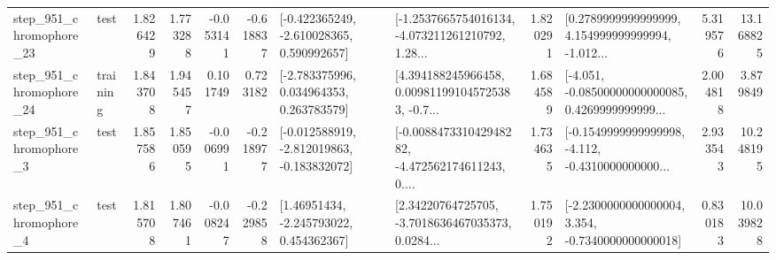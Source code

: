 \begin{tabular}{llrrrrllrlrr}
  step\_951\_chromophore\_23 &      test &      1.826429 &    1.773288 &     -0.053141 & -0.618837 &   [-0.422365249, -2.610028365, 0.590992657] &  [-1.2537665754016134, -4.073211261210792, 1.28... &       1.820291 &  [0.2789999999999999, 4.154999999999994, -1.012... &            5.319576 &         13.168825 \\
  step\_951\_chromophore\_24 &  training &      1.843708 &    1.945457 &      0.101749 &  0.723182 &    [-2.783375996, 0.034964353, 0.263783579] &  [4.394188245966458, 0.009811991045725383, -0.7... &       1.684589 &  [-4.051, -0.08500000000000085, 0.4269999999999... &            2.004818 &          3.879849 \\
   step\_951\_chromophore\_3 &      test &      1.857586 &    1.850595 &     -0.006991 & -0.218977 &  [-0.012588919, -2.812019863, -0.183832072] &  [-0.008847331042948282, -4.472562174611243, 0.... &       1.734635 &  [-0.1549999999999998, -4.112, -0.4310000000000... &            2.933543 &         10.248195 \\
   step\_951\_chromophore\_4 &      test &      1.815708 &    1.807461 &     -0.008247 & -0.229858 &     [1.46951434, -2.245793022, 0.454362367] &  [2.34220764725705, -3.7018636467035373, 0.0284... &       1.750192 &  [-2.2300000000000004, 3.354, -0.7340000000000018] &            0.830183 &         10.039828 \\
\bottomrule
\end{tabular}

